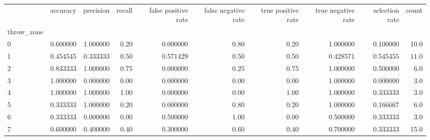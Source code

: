 \begin{tabular}{lrrrrrrrrr}
\toprule
{} &  accuracy &  precision &  recall &  false positive rate &  false negative rate &  true positive rate &  true negative rate &  selection rate &  count \\
throw\_zone &           &            &         &                      &                      &                     &                     &                 &        \\
\midrule
0          &  0.600000 &   1.000000 &    0.20 &             0.000000 &                 0.80 &                0.20 &            1.000000 &        0.100000 &   10.0 \\
1          &  0.454545 &   0.333333 &    0.50 &             0.571429 &                 0.50 &                0.50 &            0.428571 &        0.545455 &   11.0 \\
2          &  0.833333 &   1.000000 &    0.75 &             0.000000 &                 0.25 &                0.75 &            1.000000 &        0.500000 &    6.0 \\
3          &  1.000000 &   0.000000 &    0.00 &             0.000000 &                 0.00 &                0.00 &            1.000000 &        0.000000 &    3.0 \\
4          &  1.000000 &   1.000000 &    1.00 &             0.000000 &                 0.00 &                1.00 &            1.000000 &        0.333333 &    3.0 \\
5          &  0.333333 &   1.000000 &    0.20 &             0.000000 &                 0.80 &                0.20 &            1.000000 &        0.166667 &    6.0 \\
6          &  0.333333 &   0.000000 &    0.00 &             0.500000 &                 1.00 &                0.00 &            0.500000 &        0.333333 &    3.0 \\
7          &  0.600000 &   0.400000 &    0.40 &             0.300000 &                 0.60 &                0.40 &            0.700000 &        0.333333 &   15.0 \\
\bottomrule
\end{tabular}
